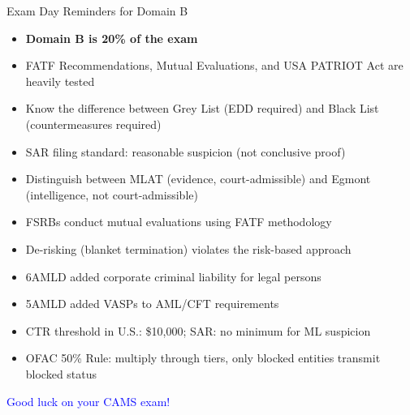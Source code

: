 \documentclass{beamer}
\begin{document}
	\begin{frame}{Exam Day Reminders for Domain B}
		\begin{itemize}
			\item \textbf{Domain B is 20\% of the exam}
			\item FATF Recommendations, Mutual Evaluations, and USA PATRIOT Act are heavily tested
			\item Know the difference between Grey List (EDD required) and Black List (countermeasures required)
			\item SAR filing standard: reasonable suspicion (not conclusive proof)
			\item Distinguish between MLAT (evidence, court-admissible) and Egmont (intelligence, not court-admissible)
			\item FSRBs conduct mutual evaluations using FATF methodology
			\item De-risking (blanket termination) violates the risk-based approach
			\item 6AMLD added corporate criminal liability for legal persons
			\item 5AMLD added VASPs to AML/CFT requirements
			\item CTR threshold in U.S.: \$10,000; SAR: no minimum for ML suspicion
			\item OFAC 50\% Rule: multiply through tiers, only blocked entities transmit blocked status
		\end{itemize}
		\vspace{0.5cm}
		\centering
		\textcolor{blue}{\Large Good luck on your CAMS exam!}
	\end{frame}
	
\end{document}
